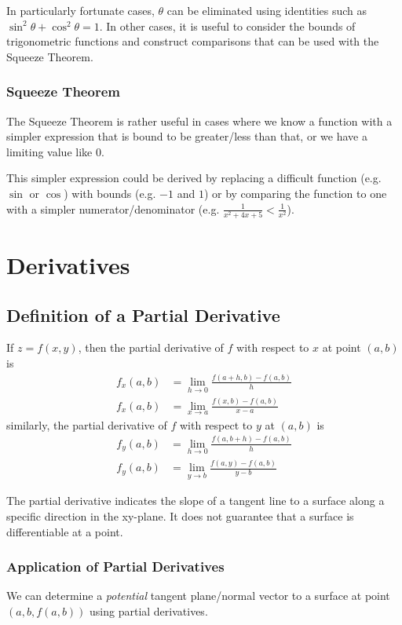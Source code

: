\documentclass{article}
\begin{document}
In particularly fortunate cases, $\theta$ can be eliminated using identities such as $\sin^2{\theta}+\cos^2{\theta}=1$. In other cases, it is useful to consider the bounds of trigonometric functions and construct comparisons that can be used with the Squeeze Theorem.

\subsubsection{Squeeze Theorem}
The Squeeze Theorem is rather useful in cases where we know a function with a simpler expression that is bound to be greater/less than that, or we have a limiting value like $0$.

This simpler expression could be derived by replacing a difficult function (e.g. $\sin$ or $\cos$) with bounds (e.g. $-1$ and $1$) or by comparing the function to one with a simpler numerator/denominator (e.g. $\frac{1}{x^2+4x+5} < \frac{1}{x^2}$).

\section{Derivatives}
\subsection{Definition of a Partial Derivative}
If $z=f(x,y)$, then the partial derivative of $f$ with respect to $x$ at point $(a,b)$ is
\begin{align*}
    f_x(a,b) &= \lim_{h\to0} \frac{f(a+h,b) - f(a,b)}{h} \\
    f_x(a,b) &= \lim_{x \to a} \frac{f(x,b)-f(a,b)}{x-a}
\end{align*}
similarly, the partial derivative of $f$ with respect to $y$ at $(a,b)$ is
\begin{align*}
    f_y(a,b) &= \lim_{h\to0} \frac{f(a,b+h) - f(a,b)}{h} \\
    f_y(a,b) &= \lim_{y \to b} \frac{f(a,y)-f(a,b)}{y-b}
\end{align*}

The partial derivative indicates the slope of a tangent line to a surface along a specific direction in the xy-plane. It does not guarantee that a surface is differentiable at a point.

\subsubsection{Application of Partial Derivatives}
We can determine a \emph{potential} tangent plane/normal vector to a surface at point $(a,b, f(a,b))$ using partial derivatives.
\end{document}
